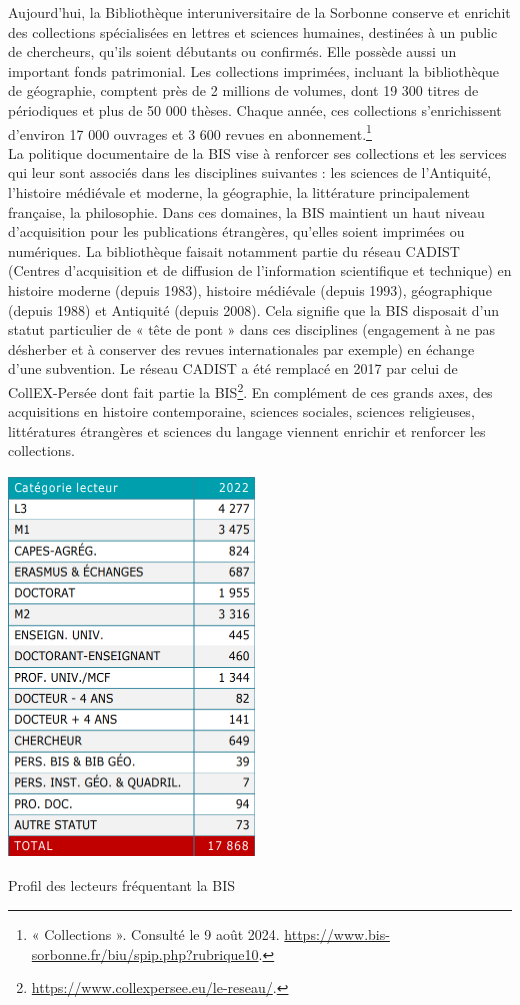 \documentclass[a4paper,12pt,twoside]{book}
\begin{document}
Aujourd'hui, la Bibliothèque interuniversitaire de la Sorbonne conserve
et enrichit des collections spécialisées en lettres et sciences
humaines, destinées à un public de chercheurs, qu'ils
soient débutants ou confirmés. Elle possède aussi un important fonds
patrimonial. Les collections imprimées, incluant la bibliothèque de
géographie, comptent près de 2 millions de volumes, dont 19 300 titres
de périodiques et plus de 50 000 thèses. Chaque année, ces collections
s'enrichissent d'environ 17 000 ouvrages et 3 600 revues en
abonnement.\footnote{« Collections ». Consulté le 9 août 2024.
	\url{https://www.bis-sorbonne.fr/biu/spip.php?rubrique10}.} \\

La politique documentaire de la BIS vise à renforcer ses collections et
les services qui leur sont associés dans les disciplines suivantes : les
sciences de l'Antiquité, l'histoire médiévale et moderne, la géographie,
la littérature principalement française, la philosophie. Dans ces
domaines, la BIS maintient un haut niveau d'acquisition pour les
publications étrangères, qu'elles soient imprimées ou
numériques. La bibliothèque faisait notamment partie du réseau CADIST (Centres d'acquisition et de diffusion de l'information scientifique et technique) en histoire moderne (depuis 1983), histoire médiévale (depuis 1993),  géographique (depuis 1988) et Antiquité (depuis 2008). Cela signifie que la BIS disposait d'un statut particulier de « tête de pont » dans ces disciplines (engagement à ne pas désherber et à conserver des revues internationales par exemple) en échange d'une subvention. Le réseau CADIST a été remplacé en 2017 par celui de CollEX-Persée dont fait partie la BIS\footnote{
	\url{https://www.collexpersee.eu/le-reseau/}.}. En complément de ces grands axes, des acquisitions en
histoire contemporaine, sciences sociales, sciences religieuses,
littératures étrangères et sciences du langage viennent enrichir et
renforcer les collections. \\


\begin{table} [H]
	\centering
	\includegraphics[width=2.56806in,height=3.98889in]{vertopal_157ae480aa4a4b07be198b586a812241/media/image25.png}
	\caption{Profil des lecteurs fréquentant la BIS}
\end{table}
\end{document}
